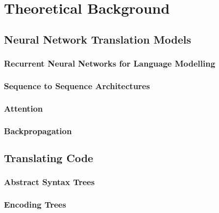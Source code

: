 \chapter{Theoretical Background}
\label{theoreticalbackground}




\section{Neural Network Translation Models} %
\label{sec:lstm}

\subsection{Recurrent Neural Networks for Language Modelling} %
\label{sub:recurrent_neural_networks}

\subsection{Sequence to Sequence Architectures} %
\label{sub:sequence_to_sequence_architectures}

\subsection{Attention} %
\label{sub:attention}

\subsection{Backpropagation} %
\label{sub:backpropagation}

\blindtext

\section{Translating Code} %
\label{sec:translating_code}

\subsection{Abstract Syntax Trees} %
\label{sub:abstract_syntax_trees}

\subsection{Encoding Trees} %
\label{sub:encoding_trees}


\blindtext
